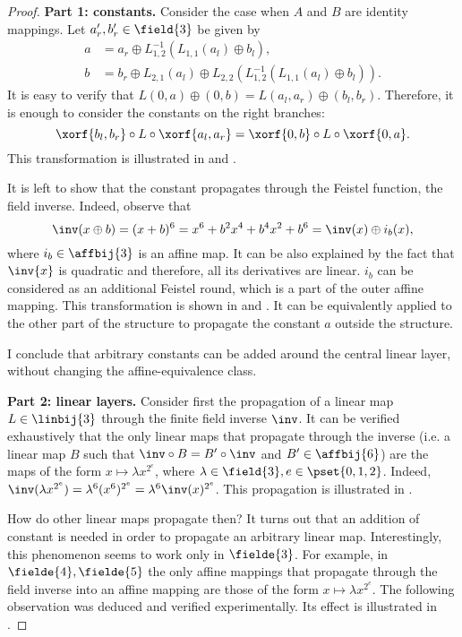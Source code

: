 \begin{proof}
\textbf{Part 1: constants.}
Consider the case when $A$ and $B$ are identity mappings. Let $a_r',b_r' \in \field{3}$ be given by
\begin{align*}
a &= a_r \oplus L_{1,2}^{-1}(L_{1,1}(a_l) \oplus b_l), \\
b &= b_r \oplus L_{2,1}(a_l) \oplus L_{2,2}(L_{1,2}^{-1}(L_{1,1}(a_l) \oplus b_l)).
\end{align*}
It is easy to verify that $L(0, a) \oplus (0, b) = L(a_l, a_r) \oplus (b_l, b_r)$. Therefore, it is enough to consider the constants on the right branches:
$$
\xorf{b_l, b_r} \circ L \circ \xorf{a_l, a_r} = \xorf{0, b} \circ L \circ \xorf{0, a}.
$$
This transformation is illustrated in  and .


It is left to show that the constant propagates through the Feistel function, the field inverse. Indeed, observe that
$$
\inv(x \oplus b) = (x + b)^6 = x^6 + b^2x^4 + b^4x^2 + b^6 = \inv(x) \oplus i_b(x),
$$
where $i_b \in \affbij{3}$ is an affine map. It can be also explained by the fact that $\inv{x}$ is quadratic and therefore, all its derivatives are linear. $i_b$ can be considered as an additional Feistel round, which is a part of the outer affine mapping. This transformation is shown in  and . It can be equivalently applied to the other part of the structure to propagate the constant $a$ outside the structure.

I conclude that arbitrary constants can be added around the central linear layer, without changing the affine-equivalence class.


\textbf{Part 2: linear layers.}
Consider first the propagation of a linear map $L\in \linbij{3}$ through the finite field inverse $\inv$. It can be verified exhaustively that the only linear maps that propagate through the inverse (i.e. a linear map $B$ such that $\inv \circ B = B'\circ \inv$ and $B' \in \affbij{6}$) are the maps of the form $x \mapsto \lambda x^{2^e}$, where $\lambda \in \field{3},e \in \pset{0,1,2}$. Indeed, $\inv(\lambda x^{2^e}) = \lambda^6 (x^6)^{2^e} = \lambda^6 \inv(x)^{2^e}$. This propagation is illustrated in .


How do other linear maps propagate then? It turns out that an addition of constant is needed in order to propagate an arbitrary linear map.  Interestingly, this phenomenon seems to work only in $\fielde{3}$. For example, in $\fielde{4},\fielde{5}$ the only affine mappings that propagate through the field inverse into an affine mapping are those of the form $x \mapsto \lambda x^{2^e}$. The following observation was deduced and verified experimentally. Its effect is illustrated in .


\end{proof}
